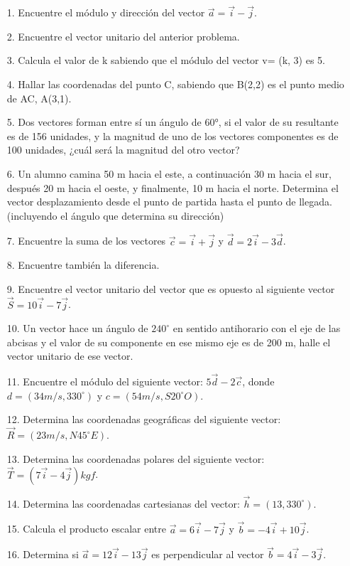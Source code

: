 \documentclass[a5paper,pagesize,10pt,bibtotoc,pointlessnumbers,
normalheadings,DIV=9,fleqn,x11names,table,twoside=false]{scrbook}
\begin{document}
\begin{itemize}
 \item[1.] Encuentre el módulo y dirección del vector $\vec{a}= \vec{i} - \vec{j}$.
 \item[2.] Encuentre el vector unitario del anterior problema.
 \item[3.] Calcula el valor de k sabiendo que el módulo del vector v= (k, 3) es 5.
 \item[4.] Hallar las coordenadas del punto C, sabiendo que B(2,2) es el punto medio de AC, A(3,1).
 \item[5.] Dos vectores forman entre sí un ángulo de 60°, si el valor de su resultante es de 156 unidades, y la magnitud de uno de 
los vectores componentes es de 100 unidades, ¿cuál será la magnitud del otro vector?
 \item[6.]Un alumno camina 50 m hacia el este, a continuación 30 m hacia el sur, después 20 m hacia el oeste, y finalmente, 10 m 
hacia el norte. Determina el vector desplazamiento desde el punto de partida hasta el punto de llegada. (incluyendo el ángulo que 
determina su dirección)
 \item[7.] Encuentre la suma de los vectores $\vec{c}=\vec{i}+\vec{j}$ y $\vec{d}=2\vec{i}-3\vec{d}$.
 \item[8.] Encuentre también la diferencia.
 \item[9.] Encuentre el vector unitario del vector que es opuesto al siguiente vector $\vec{S} =  10\vec{i}-7\vec{j}$.
 \item[10.] Un vector hace un ángulo de $240^\circ$ en sentido antihorario con el eje de las abcisas y el valor de su componente 
en ese mismo eje es de 200 m, halle el vector unitario de ese vector.
 \item[11.] Encuentre el módulo del siguiente vector: $5\vec{d}-2\vec{c}$, donde $d=(34 m/s, 330^\circ)$ y $c = (54m/s, S20^\circ 
O)$.
 \item[12.] Determina las coordenadas geográficas del siguiente vector: $\vec{R}=(23 m/s,N45^\circ E)$.
 \item[13.] Determina las coordenadas polares del siguiente vector: $\vec{T}=(7\vec{i}-4\vec{j})kgf$.
 \item[14.] Determina las coordenadas cartesianas del vector: $\vec{h}=(13,330^\circ)$.
\item[15.] Calcula el producto escalar entre $\vec{a}=6\vec{i}-7\vec{j}$ y $\vec{b}=-4\vec{i}+10\vec{j}$.
\item[16.] Determina si $\vec{a} = 12\vec{i}-13\vec{j}$ es perpendicular al vector $\vec{b}=4\vec{i}-3\vec{j}$.

\end{itemize}
\end{document}
